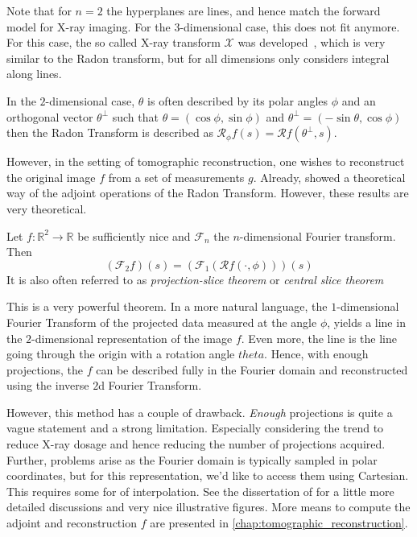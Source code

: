 Note that for \(n=2\) the hyperplanes are lines, and hence match the forward model for X-ray
imaging. For the 3-dimensional case, this does not fit anymore. For this case, the so called X-ray
transform \(\mathscr{X}\) was developed~\cite{solmon_x-ray_1976}, which is very similar to the Radon
transform, but for all dimensions only considers integral along lines.

In the \(2\)-dimensional case, \(\theta\) is often described by its polar angles \(\phi\) and an
orthogonal vector \(\theta^\perp\) such that
\( \theta = (\cos \phi, \sin \phi)\) and \(\theta^\perp = (-\sin\theta, \cos\phi)\)
then the Radon Transform is described as \( \mathscr{R}_\phi f(s) =\mathscr{R}f(\theta^\perp, s)\).

However, in the setting of tomographic reconstruction, one wishes to reconstruct the original image
\(f\) from a set of measurements \(g\). Already, \citeauthor*{radon_uber_1917} showed a theoretical
way of the adjoint operations of the Radon Transform. However, these results are very theoretical.

\begin{definition}\label{def:fourier_slice_theorem}
	Let \(f\colon \mathbb{R}^2 \to \mathbb{R}\) be sufficiently nice and \(\mathscr{F}_n\) the
	\(n\)-dimensional Fourier transform. Then
	\[ (\mathscr{F}_2f)(s) = (\mathscr{F}_1(\mathscr{R}f(\cdot, \phi)))(s) \]
	It is also often referred to as \textit{projection-slice theorem} or \textit{central slice theorem}
\end{definition}

This is a very powerful theorem. In a more natural language, the \(1\)-dimensional Fourier Transform
of the projected data measured at the angle \(\phi\), yields a line in the \(2\)-dimensional
representation of the image \(f\). Even more, the line is the line going through the origin with a
rotation angle \(theta\). Hence, with enough projections, the \(f\) can be described fully in the
Fourier domain and reconstructed using the inverse \(2\)d Fourier Transform.

However, this method has a couple of drawback. \textit{Enough} projections is quite a vague
statement and a strong limitation. Especially considering the trend to reduce X-ray dosage and hence
reducing the number of projections acquired. Further, problems arise as the Fourier domain is
typically sampled in polar coordinates, but for this representation, we'd like to access them using
Cartesian. This requires some for of interpolation. See the dissertation of
\citeauthor{vogel_tomographic_nodate}\cite[chap. 4.1.2]{vogel_tomographic_nodate} for a little more
detailed discussions and very nice illustrative figures. More means to compute the adjoint and
reconstruction \(f\) are presented in \autoref{chap:tomographic_reconstruction}.

